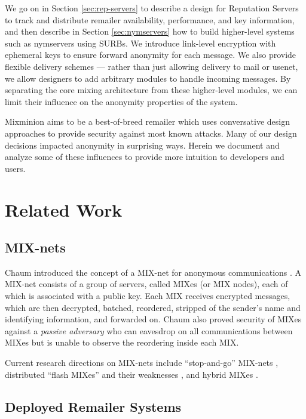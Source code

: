 \documentclass{llncs}
\begin{document}
We go on in Section \ref{sec:rep-servers} to describe a design for
Reputation Servers to track and distribute remailer availability,
performance, and key information, and then describe in Section
\ref{sec:nymservers} how to build higher-level systems such as nymservers
using SURBs. We introduce link-level encryption with ephemeral keys to
ensure forward anonymity for each message. We also provide flexible
delivery schemes --- rather than just allowing delivery to mail or
usenet, we allow designers to add arbitrary modules to handle incoming
messages. By separating the core mixing architecture from these
higher-level modules, we can limit their influence on the anonymity
properties of the system.

Mixminion aims to be a best-of-breed remailer which uses conversative
design approaches to provide security against most known attacks.
Many of our design decisions impacted anonymity in surprising ways. Herein
we document and analyze some of these influences to provide more intuition
to developers and users.


\section{Related Work}

\subsection{MIX-nets}

Chaum introduced the concept of a MIX-net for anonymous communications
\cite{chaum-mix}. A MIX-net consists of a group of servers, called MIXes
(or MIX nodes), each of which is associated with a public key. Each
MIX receives encrypted messages, which are then decrypted, batched,
reordered, stripped of the sender's name and identifying information, and
forwarded on. Chaum also proved security of MIXes against a \emph{passive
adversary} who can eavesdrop on all communications between MIXes but is
unable to observe the reordering inside each MIX.

Current research directions on MIX-nets include ``stop-and-go'' MIX-nets
\cite{kesdogan}, distributed ``flash MIXes'' \cite{flash-mix} and their
weaknesses \cite{desmedt,mitkuro}, and hybrid MIXes \cite{hybrid-mix}.

\subsection{Deployed Remailer Systems}
\end{document}
